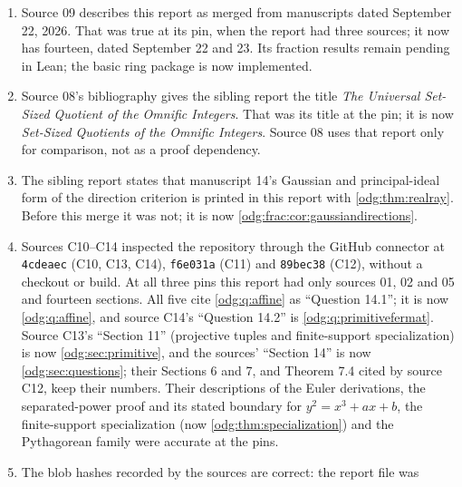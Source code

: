 \documentclass[11pt,oneside]{article}
\numberwithin{equation}{section}
\theoremstyle{definition}
\theoremstyle{remark}
\begin{document}
\begin{enumerate}[leftmargin=*]
at \texttt{9a385d3}, without a checkout or build. Both cite the
rational-direction criterion as ``Theorem 11.5'' of this report; it was 11.5 at
their pin and is now \cref{odg:thm:realray}, since sources 06 and 07 were
inserted as \cref{odg:def:sec:arithmetic,odg:def:sec:ct,odg:def:sec:reconstruction}.
Likewise source 09's ``\S\S4,11'' for the absence of lowest terms are now
\cref{odg:sec:class,odg:sec:primitive}. Their other citations
(\cref{odg:thm:commondivisor,odg:cor:Pglobal,odg:thm:fractions,odg:thm:nogcd},
and the floor of \cref{odg:sec:basic}) are accurate.
\item Source 09 describes this report as merged from manuscripts dated
September 22, 2026. That was true at its pin, when the report had three
sources; it now has fourteen, dated September 22 and 23. Its fraction results
remain pending in Lean; the basic ring package is now implemented.
\item Source 08's bibliography gives the sibling report the title \emph{The
Universal Set-Sized Quotient of the Omnific Integers}. That was its title at the
pin; it is now \emph{Set-Sized Quotients of the Omnific Integers}. Source 08 uses
that report only for comparison, not as a proof dependency.
\item The sibling report states that manuscript 14's Gaussian and
principal-ideal form of the direction criterion is printed in this report with
\cref{odg:thm:realray}. Before this merge it was not; it is now
\cref{odg:frac:cor:gaussiandirections}.
\item Sources C10--C14 inspected the repository through the GitHub connector at
\texttt{4cdeaec} (C10, C13, C14), \texttt{f6e031a} (C11) and \texttt{89bec38}
(C12), without a checkout or build. At all three pins this report had only sources 01,
02 and 05 and fourteen sections. All five cite \cref{odg:q:affine} as ``Question
14.1''; it is now \cref{odg:q:affine}, and source C14's ``Question 14.2'' is
\cref{odg:q:primitivefermat}. Source C13's ``Section 11'' (projective tuples and
finite-support specialization) is now \cref{odg:sec:primitive}, and the sources'
``Section 14'' is now \cref{odg:sec:questions}; their Sections 6 and 7, and
Theorem 7.4 cited by source C12, keep their numbers. Their descriptions of the Euler
derivations, the separated-power proof and its stated boundary for
$y^2=x^3+ax+b$, the finite-support specialization (now
\cref{odg:thm:specialization}) and the Pythagorean family were accurate at the pins.
\item The blob hashes recorded by the sources are correct: the report file was

\end{enumerate}
\end{document}
